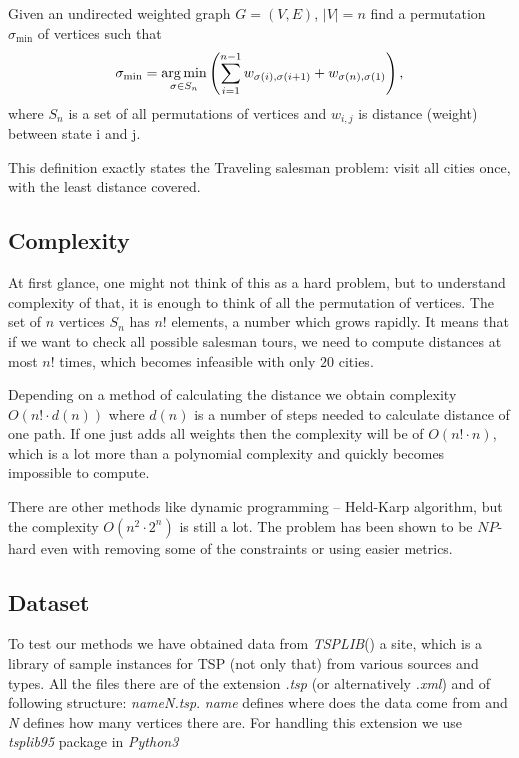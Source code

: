 	\begin{definition}
		Given an undirected weighted graph $G = (V, E)$, $|V| = n$ find a permutation $\sigma_{\min}$ of vertices such that
		\begin{equation*}
			\sigma_{\min} = \underset{\sigma \in S_n}{\operatorname*{arg\,min}} \left( \sum_{i=1}^{n-1} w_{\sigma(i), \sigma(i+1)} + w_{\sigma(n), \sigma(1)} \right),
		\end{equation*}
		where $S_n$ is a set of all permutations of vertices and $w_{i,j}$ is distance (weight) between state i and j.
	\end{definition}
	This definition exactly states the Traveling salesman problem: visit all cities once, with the least distance covered.
	
\subsection{Complexity}
	At first glance, one might not think of this as a hard problem, but to understand complexity of that, it is enough to think of all the permutation of vertices. The set of $n$ vertices $S_n$ has $n!$ elements, a number which grows rapidly. It means that if we want to check all possible salesman tours, we need to compute distances at most $n!$ times, which becomes infeasible with only $20$ cities. 
	
	Depending on a method of calculating the distance we obtain complexity $O(n! \cdot d(n))$ where $d(n)$ is a number of steps needed to calculate distance of one path. If one just adds all weights then the complexity will be of $O(n! \cdot n)$, which is a lot more than a polynomial complexity and quickly becomes impossible to compute.
	
	There are other methods like dynamic programming -- Held-Karp algorithm, but the complexity $O(n^2 \cdot 2^n)$ is still a lot. The problem has been shown to be $NP$-hard even with removing some of the constraints or using easier metrics.

\subsection{Dataset}
	To test our methods we have obtained data from \textit{TSPLIB}(\cite{TSPLIB8:online}) a site, which is a library of sample instances for TSP (not only that) from various sources and types. All the files there are of the extension \textit{.tsp} (or alternatively \textit{.xml}) and of following structure: \textit{nameN.tsp}. \textit{name} defines where does the data come from and \textit{N} defines how many vertices there are. For handling this extension we use \textit{tsplib95} package in \textit{Python3}
	
